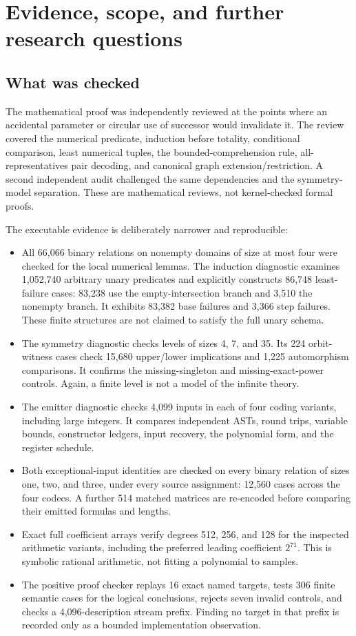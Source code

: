 \section{Evidence, scope, and further research questions}
\label{sec:validation}

\subsection{What was checked}

The mathematical proof was independently reviewed at the points where an accidental parameter or circular use of successor would invalidate it. The review covered the numerical predicate, induction before totality, conditional comparison, least numerical tuples, the bounded-comprehension rule, all-representatives pair decoding, and canonical graph extension/restriction. A second independent audit challenged the same dependencies and the symmetry-model separation. These are mathematical reviews, not kernel-checked formal proofs.

The executable evidence is deliberately narrower and reproducible:
\begin{itemize}
\item All 66,066 binary relations on nonempty domains of size at most four were checked for the local numerical lemmas. The induction diagnostic examines 1,052,740 arbitrary unary predicates and explicitly constructs 86,748 least-failure cases: 83,238 use the empty-intersection branch and 3,510 the nonempty branch. It exhibits 83,382 base failures and 3,366 step failures. These finite structures are not claimed to satisfy the full unary schema.
\item The symmetry diagnostic checks levels of sizes 4, 7, and 35. Its 224 orbit-witness cases check 15,680 upper/lower implications and 1,225 automorphism comparisons. It confirms the missing-singleton and missing-exact-power controls. Again, a finite level is not a model of the infinite theory.
\item The emitter diagnostic checks 4,099 inputs in each of four coding variants, including large integers. It compares independent ASTs, round trips, variable bounds, constructor ledgers, input recovery, the polynomial form, and the register schedule.
\item Both exceptional-input identities are checked on every binary relation of sizes one, two, and three, under every source assignment: 12,560 cases across the four codecs. A further 514 matched matrices are re-encoded before comparing their emitted formulas and lengths.
\item Exact full coefficient arrays verify degrees 512, 256, and 128 for the inspected arithmetic variants, including the preferred leading coefficient $2^{71}$. This is symbolic rational arithmetic, not fitting a polynomial to samples.
\item The positive proof checker replays 16 exact named targets, tests 306 finite semantic cases for the logical conclusions, rejects seven invalid controls, and checks a 4,096-description stream prefix. Finding no target in that prefix is recorded only as a bounded implementation observation.
\end{itemize}

